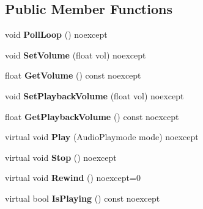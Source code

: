 \subsection*{Public Member Functions}
\begin{DoxyCompactItemize}
\item 
\mbox{\label{class_blade_1_1_audio_stream_ae677dd9991239004fcea60f824df695e}} 
void {\bfseries Poll\+Loop} () noexcept
\item 
\mbox{\label{class_blade_1_1_audio_stream_ae1e5c119c0de2120e784fe66d40ff1c0}} 
void {\bfseries Set\+Volume} (float vol) noexcept
\item 
\mbox{\label{class_blade_1_1_audio_stream_a37c9f940bda58ba05260809b1883b585}} 
float {\bfseries Get\+Volume} () const noexcept
\item 
\mbox{\label{class_blade_1_1_audio_stream_a77b6454ceb388925638175ffbde0bcc7}} 
void {\bfseries Set\+Playback\+Volume} (float vol) noexcept
\item 
\mbox{\label{class_blade_1_1_audio_stream_a16e9091c38bffd0e684dafa91d50d80c}} 
float {\bfseries Get\+Playback\+Volume} () const noexcept
\item 
\mbox{\label{class_blade_1_1_audio_stream_a6a5eda459b6cffa4fdb2589c38b62108}} 
virtual void {\bfseries Play} (Audio\+Playmode mode) noexcept
\item 
\mbox{\label{class_blade_1_1_audio_stream_a5af524c745c96aa50dc0f8d9c01eafc4}} 
virtual void {\bfseries Stop} () noexcept
\item 
\mbox{\label{class_blade_1_1_audio_stream_a41319ff778f3d14d0f438bef5d6e5e60}} 
virtual void {\bfseries Rewind} () noexcept=0
\item 
\mbox{\label{class_blade_1_1_audio_stream_a5cd8185b2128aa510e170e69de31f4df}} 
virtual bool {\bfseries Is\+Playing} () const noexcept
\item 
\mbox{\label{class_blade_1_1_audio_stream_ac0967b0c63c287c5b0728b911e7210c4}} 

\end{DoxyCompactItemize}
